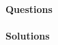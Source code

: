 \documentclass{report}
\begin{document}
\paragraph{Questions}
\begin{enumerate}
  \foreachproblem{\item\thisproblem}
\end{enumerate}
\paragraph {Solutions}
\showanswers
\onlysolution
\begin{enumerate}
  \foreachproblem{\item\thisproblem}
\end{enumerate}
\end{document}

